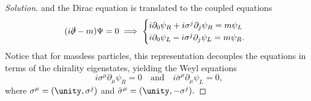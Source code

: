 \begin{proof}[Solution]
   and the Dirac equation is translated to the coupled equations
   \begin{equation*}
      (i \slashed{\partial} - m)\Psi = 0 \implies \begin{cases}
          i \partial_0 \psi_R + i \sigma^j \partial_j \psi_R = m \psi_L\\
          i \partial_0 \psi_L - i \sigma^j \partial_j \psi_L = m \psi_R.
      \end{cases}
   \end{equation*}
   Notice that for massless particles, this representation decouples the equations in terms of the chirality eigenstates, yielding the Weyl equations
   \begin{equation*}
      i \sigma^\mu \partial_\mu \psi_R = 0 \quad\text{and}\quad i \bar{\sigma}^\mu \partial_\mu \psi_L = 0,
   \end{equation*}
   where \(\sigma^\mu = (\unity, \sigma^j)\) and \(\bar{\sigma}^\mu = (\unity, -\sigma^j).\)


\end{proof}
